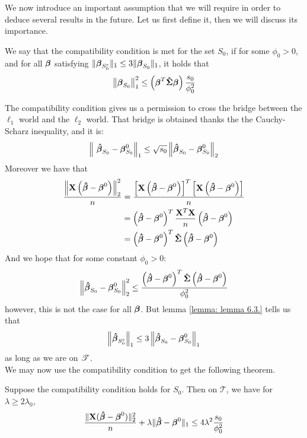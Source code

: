 We now introduce an important assumption that we will require in order to deduce several results in the future. Let us first define it, then we will discuss its importance.
\begin{definition}
    We say that the compatibility condition is met for the set $S_{0}$, if for some $\phi_{0}>0$, and for all $\boldsymbol{\beta}$ satisfying $ \|\boldsymbol{\beta}_{S_{0}^{c}} \|_{1} \leq 3 \|\boldsymbol{\beta}_{S_{0}} \|_{1}$, it holds that
    \begin{equation}
        \left\| \boldsymbol{\beta}_{S_{0}} \right\|_{1}^{2} \leq \left(\boldsymbol{\beta}^{T} \boldsymbol{\hat{\Sigma}} \boldsymbol{\beta}\right) \frac{s_{0}}{\phi_{0}^{2}}
    \end{equation}
\end{definition}
The compatibility condition gives us a permission to cross the bridge between the \(\ell_1\) world and the \(\ell_2\) world. That bridge is obtained thanks the the Cauchy-Scharz inequality, and it is:
\[
    \left\|\ \boldsymbol{\hat{\beta}}_{S_{0}} - \boldsymbol{\beta}_{S_{0}}^{0} \right\|_{1} \leq \sqrt{s_{0}}\left\|\boldsymbol{\hat{\beta}}_{S_{0}} - \boldsymbol{\beta}_{S_{0}}^{0} \right\|_{2}
\]
Moreover we have that
\begin{align*}
    \frac{\left\|\mathbf{X}\left(\boldsymbol{\hat{\beta}} - \boldsymbol{\beta}^{0}\right)\right\|_{2}^{2}}{n}
     & = \frac{\left[ \mathbf{X} \left( \boldsymbol{\hat{\beta}} - \boldsymbol{\beta}^{0}\right) \right]^T \left[\mathbf{X} \left(\boldsymbol{\hat{\beta}} - \boldsymbol{\beta}^{0}\right) \right]}{n} \\
     & = \left(\boldsymbol{\hat{\beta}} - \boldsymbol{\beta}^{0}\right)^{T} \frac{ \mathbf{X}^T \mathbf{X} }{n} \left(\boldsymbol{\hat{\beta}} - \boldsymbol{\beta}^{0}\right)                         \\
     & = \left(\boldsymbol{\hat{\beta}} - \boldsymbol{\beta}^{0}\right)^{T} \boldsymbol{\hat{\Sigma}} \left(\boldsymbol{\hat{\beta}} - \boldsymbol{\beta}^{0}\right)
\end{align*}
And we hope that for some constant \(\phi_0 > 0\):
\[
    \left\| \boldsymbol{\hat{\beta}}_{S_0} - \boldsymbol{\beta}_{S_0}^{0} \right\|_{2}^{2} \leq \frac{\left(\boldsymbol{\hat{\beta}} - \boldsymbol{\beta}^{0}\right)^{T} \boldsymbol{\hat{\Sigma}} \left(\boldsymbol{\hat{\beta}} - \boldsymbol{\beta}^{0}\right)}{\phi_0^2}
\]
however, this is not the case for all \(\boldsymbol{\beta}\). But lemma \ref{lemma: lemma 6.3.} tells us that
\[
    \left\|\boldsymbol{\hat{\beta}}_{S_{0}^{c}}\right\|_{1} \leq 3\left\|\boldsymbol{\hat{\beta}}_{S_{0}}-\boldsymbol{\beta}_{S_{0}}^{0}\right\|_{1}
\]
as long as we are on \(\mathscr{T}\). \\
We may now use the compatibility condition to get the following theorem.
\begin{theorem} %
    \label{theorem: theorem 6.1}
    Suppose the compatibility condition holds for $S_{0}$. Then on $\mathscr{T}$, we have for $\lambda \geq 2 \lambda_{0}$,
    \[
        \frac{\|\mathbf{X}(\boldsymbol{\hat{\beta}}-\boldsymbol{\beta}^{0})\|_{2}^{2}}{n}+\lambda\|\boldsymbol{\hat{\beta}}-\boldsymbol{\beta}^{0}\|_{1} \leq 4 \lambda^{2} \frac{s_{0}}{\phi_{0}^{2}}
    \]
\end{theorem}
